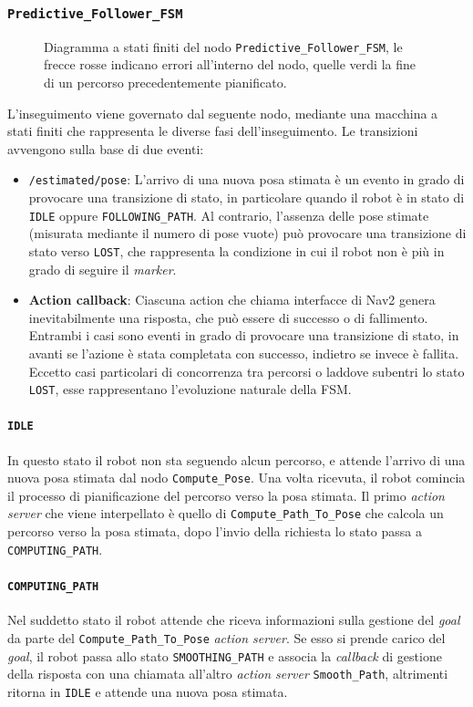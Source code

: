 \documentclass[12pt]{article}
\begin{document}
\subsubsection{\texttt{Predictive\_Follower\_FSM}}
\begin{figure}[htbp]
    \centering
  
  \caption{Diagramma a stati finiti del nodo \texttt{Predictive\_Follower\_FSM}, le frecce rosse indicano errori all'interno del nodo, quelle verdi la fine di un percorso precedentemente pianificato.}
\end{figure}
L'inseguimento viene governato dal seguente nodo, mediante una macchina a stati finiti che rappresenta le diverse fasi dell'inseguimento. Le transizioni avvengono sulla base di due eventi: 
\begin{itemize}
    \item \texttt{/estimated/pose}: L'arrivo di una nuova posa stimata è un evento in grado di provocare una transizione di stato, in particolare quando il robot è in stato di \texttt{IDLE} oppure \texttt{FOLLOWING\_PATH}. Al contrario, l'assenza delle pose stimate (misurata mediante il numero di pose vuote) può provocare una transizione di stato verso \texttt{LOST}, che rappresenta la condizione in cui il robot non è più in grado di seguire il \textit{marker}.
    \item  \textbf{Action callback}: Ciascuna action che chiama interfacce di Nav2 genera inevitabilmente una risposta, che può essere di successo o di fallimento. Entrambi i casi sono eventi in grado di provocare una transizione di stato, in avanti se l'azione è stata completata con successo, indietro se invece è fallita. Eccetto casi particolari di concorrenza tra percorsi o laddove subentri lo stato \texttt{LOST}, esse rappresentano l'evoluzione naturale della FSM.
\end{itemize}
\paragraph{\texttt{IDLE}} In questo stato il robot non sta seguendo alcun percorso, e attende l'arrivo di una nuova posa stimata dal nodo \texttt{Compute\_Pose}. Una volta ricevuta, il robot comincia il processo di pianificazione del percorso verso la posa stimata. Il primo \textit{action server} che viene interpellato è quello di \texttt{Compute\_Path\_To\_Pose} che calcola un percorso verso la posa stimata, dopo l'invio della richiesta lo stato passa a \texttt{COMPUTING\_PATH}.
\paragraph{\texttt{COMPUTING\_PATH}} Nel suddetto stato il robot attende che riceva informazioni sulla gestione del \textit{goal} da parte del \texttt{Compute\_Path\_To\_Pose} \textit{action server}. Se esso si prende carico del \textit{goal}, il robot passa allo stato \texttt{SMOOTHING\_PATH} e associa la \textit{callback} di gestione della risposta con una chiamata all'altro \textit{action server} \texttt{Smooth\_Path}, altrimenti ritorna in \texttt{IDLE} e attende una nuova posa stimata.
\end{document}
